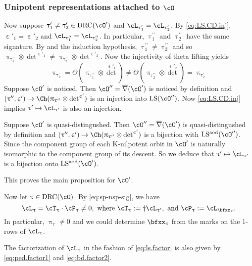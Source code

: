 \documentclass[12pt,a4paper]{amsart}
\newcommand{\bfone}{\mathbf{1}}
\def\eDD{\overline{\nabla}}
\numberwithin{equation}{section}
\theoremstyle{remark}
\def\ssign{\mathrm{Sign}}
\def\Thetab{\bar{\Theta}}
\def\drc{\mathrm{DRC}}
\def\LS{\mathrm{LS}}
\def\LSaod{\mathrm{LS^{aod}}}
\def\cOp{\cO^{\prime}}
\def\cOpp{\cO^{\prime\prime}}
\def\uptaup{\uptau^{\prime}}
\def\uptaupp{\uptau^{\prime\prime}}
\begin{document}
\subsubsection{Unipotent representations attached to $\cO$}
Now suppose $\uptaup_{1}\neq \uptaup_{2}\in \drc(\cOp)$ and
$\cL_{\uptaup_{1}}=\cL_{\uptaup_{2}}$. By \eqref{eq:LS.CD.inj},
$\upepsilon'_{1}=\upepsilon'_{2}$ and $\cL_{\uptaupp_{1}}=\cL_{\uptaupp_{2}}$.
In particular,  $\uptaupp_{1}$ and $\uptaupp_{2}$  have the same signature. %
By  and the induction hypothesis, $\uptaupp_{1}\neq \uptaupp_{2}$ and so
$\uppi_{\uptaupp_{1}}\otimes {\det}^{\upepsilon'_{1}} \neq \uppi_{\uptaupp_{2}}\otimes {\det}^{\upepsilon'_{2}}$.
Now the injectivity of theta lifting yields
\[
  \uppi_{\uptaup_{2}} = \Thetab(\uppi_{\uptaupp_{1}}\otimes {\det}^{\upepsilon'_{1}})
  \neq \Thetab(\uppi_{\uptaupp_{2}}\otimes {\det}^{\upepsilon'_{2}}) = \uppi_{\uptaup_{2}}
\]
Suppose $\cOp$ is noticed. Then $\cOpp = \eDD(\cOp)$ is noticed by definition
and
$(\uptaupp,\upepsilon')\mapsto \Ch(\uppi_{\uptaupp}\otimes{\det}^{\upepsilon'})$
is an injection into $\LS(\cOpp)$.
Now \eqref{eq:LS.CD.inj} implies $\uptaup\mapsto\cL_{\uptaup}$ is also an injection.

Suppose $\cOp$ is quasi-distingushed. Then $\cOpp = \eDD(\cOp)$ is
quasi-distingushed by definition
and
$(\uptaupp,\upepsilon')\mapsto \Ch(\uppi_{\uptaupp}\otimes{\det}^{\upepsilon'})$
is  a bijection with $\LSaod(\cOpp)$.
Since the component group of each K-nilpotent orbit in $\cOp$ is naturally
isomorphic to the component group of its descent. So we deduce that $\uptaup \mapsto \cL_{\uptaup}$
is a bijection onto $\LSaod(\cOp)$.

This proves the main proposition for $\cOp$.


Now let $\uptau\in \drc(\cO)$. %
By \eqref{eq:sp-nsp-sig}, we have
\begin{equation}\label{eq:LS.D.ds}
  \cL_{\uptau} =  \cT_{\uptau}\cdot \cP_{\uptau}\neq 0, \text{ where
  }\cT_{\uptau} := \dagger\cL_{\uptaup}, \text{ and } \cP_{\uptau}:=\cL_{\bfxx_{\uptau}}.
\end{equation}
In particular, $\uppi_{\uptau}\neq 0$ and we could determine $\bfxx_{\uptau}$ from
the marks on the 1-rows of $\cL_{\uptau}$.

The factorization of $\cL_{\uptau}$ in the fashion of \eqref{eq:ls.factor} is also given by
\eqref{eq:ped.factor1} and \eqref{eq:bd.factor2}.
\end{document}
